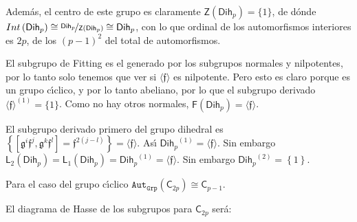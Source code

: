 \documentclass[final,12pt,a4paper,twoside,fleqn]{extbook}
\newcommand{\graut}[1]{\ensuremath{{\mathtt{Aut}}_{\mathtt{Grp}}{\left({#1}\right)}}}
\newcommand{\grclass}[1]{\ensuremath{\mathsf{#1}}}
\newcommand{\cyclicgr}[1]{\ensuremath{{\grclass{C}}_{#1}}}
\newcommand{\dihgr}[1]{\ensuremath{{\grclass{Dih}}_{#1}}}
\theoremstyle{definition}
\theoremstyle{remark}
\begin{document}
Adem\'as, el centro de este grupo es claramente $\mathsf{Z}\left({\dihgr{p}}\right)=\{1\}$, de d\'onde $Int\left({\dihgr{p}}\right)                  \cong                  \nicefrac{{\dihgr{p}}}{\mathsf{Z}({\dihgr{p}})}                  \cong                  {\dihgr{p}}$, con lo que ordinal de los automorfismos interiores es $2p$, de los $(p-1)^2$ del total de automorfismos.

El subgrupo de Fitting es el generado por los subgrupos normales y nilpotentes, por lo tanto solo tenemos que ver si $\langle \mathfrak{f} \rangle$ es nilpotente. Pero esto es claro porque es un grupo c{\'{\i}}clico, y por lo tanto abeliano, por lo que el subgrupo derivado ${\langle \mathfrak{f} \rangle}^{(1)} = \{1\}$. Como no hay otros normales, $\mathsf{F}(\dihgr{p})=\langle \mathfrak{f} \rangle$.

El subgrupo derivado primero del grupo dihedral es
$\left\{ \left[ \mathfrak{g}^{i}\mathfrak{f}^{j},\mathfrak{g}^{k}\mathfrak{f}^{l} \right]=\mathfrak{f}^{2(j-l)} \right\} = \langle \mathfrak{f} \rangle$.
 As{\'{\i}} ${\dihgr{p}}^{(1)} = \langle \mathfrak{f} \rangle$. Sin embargo ${\mathsf{L}}_{2}\left( \dihgr{p}
\right) = {\mathsf{L}}_{1}\left( \dihgr{p} \right) = {\dihgr{p}}^{(1)} = \langle \mathfrak{f} \rangle$.
 Sin embargo ${\dihgr{p}}^{(2)} = \left\{1\right\}$.


Para el caso del grupo c{\'{\i}}clico $\graut{\cyclicgr{2p}}       \cong        \cyclicgr{p-1}$.


El diagrama de Hasse de los subgrupos para $\cyclicgr{2p}$ ser\'a:

\begin{center}
\end{center}
\end{document}
